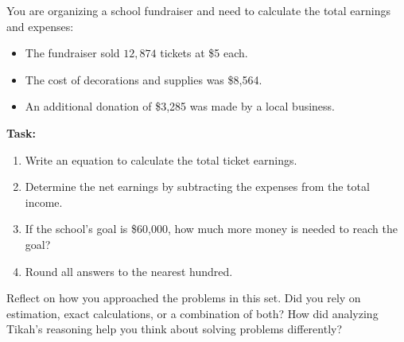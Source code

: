 \documentclass[12pt]{article}
\begin{document}
\begin{tcolorbox}[colframe=black!60, colback=white, 
coltitle=black, colbacktitle=black!15, fonttitle=\bfseries\Large, 
title=Performance Task: Plan a School Fundraiser, halign title=center, left=10pt, right=10pt, top=10pt, bottom=50pt]
You are organizing a school fundraiser and need to calculate the total earnings and expenses:
\begin{itemize}
    \item The fundraiser sold \( 12,874 \) tickets at \$5 each.
    \item The cost of decorations and supplies was \$8,564.
    \item An additional donation of \$3,285 was made by a local business.
\end{itemize}
\textbf{Task:}
\begin{enumerate}[itemsep=3em]
    \item Write an equation to calculate the total ticket earnings. \vspace{1cm}
    \item Determine the net earnings by subtracting the expenses from the total income. \vspace{1cm}
    \item If the school’s goal is \$60,000, how much more money is needed to reach the goal? \vspace{1cm}
    \item Round all answers to the nearest hundred. \vspace{1cm}
\end{enumerate}
\end{tcolorbox}

\vspace{1em}

\begin{tcolorbox}[colframe=black!60, colback=white, 
coltitle=black, colbacktitle=black!15, fonttitle=\bfseries\Large, 
title=Reflection, halign title=center, left=10pt, right=10pt, top=10pt, bottom=120pt]
Reflect on how you approached the problems in this set. Did you rely on estimation, exact calculations, or a combination of both? How did analyzing Tikah's reasoning help you think about solving problems differently?
\end{tcolorbox}
\end{document}
